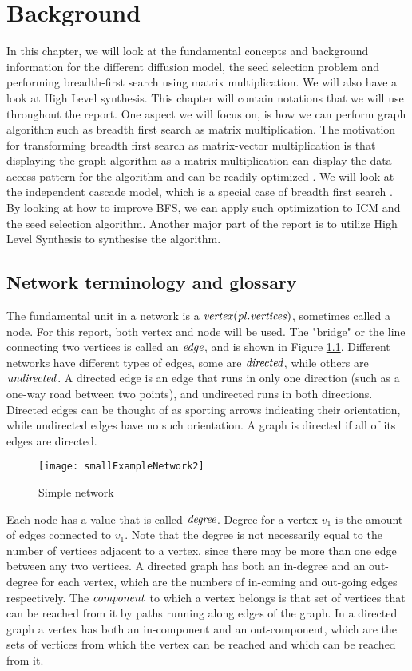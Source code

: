 \chapter{Background} \label{background}

In this chapter, we will look at the fundamental concepts and background information for the different diffusion model, the seed selection problem and performing breadth-first search using matrix multiplication. We will also have a look at High Level synthesis. This chapter will contain notations that we will use throughout the report. One aspect we will focus on, is how we can perform graph algorithm such as breadth first search as matrix multiplication. The motivation for transforming breadth first search as matrix-vector multiplication is that displaying the graph algorithm as a matrix multiplication can display the data access pattern for the algorithm and can be readily optimized  \cite{AlgoToMath}. We will look at the independent cascade model, which is a special case of breadth first search  \cite{HybridBFS2015}. By looking at how to improve BFS, we can apply such optimization to ICM and the seed selection algorithm. Another major part of the report is to utilize High Level Synthesis to synthesise the algorithm. 


\section{Network terminology and glossary}
The fundamental unit in a network is a $\it{{vertex}} (pl. vertices)$, sometimes called a node. For this report, both vertex and node will be used. The "bridge" or the line connecting two vertices is called an $\it{{edge}}$, and is shown in Figure \ref{fig:SimpleGraph}.  Different networks have different types of edges, some are $\it{directed}$, while others are $\it {undirected}$. A directed edge is an edge that runs in only one direction (such as a one-way road between two points), and undirected runs in both directions. Directed edges can be thought of as sporting arrows indicating their orientation, while undirected edges have no such orientation. A graph is directed if all of its edges are directed.

\begin{figure}[!ht]
	\texttt{[image: smallExampleNetwork2]}
	\caption{Simple network} 
	\label{fig:SimpleGraph}
\end{figure}


Each node has a value that is called $\it{{degree}}$. Degree for a vertex $v_1$ is the amount of edges connected to $v_1$. Note that the degree is not necessarily equal to the number of vertices adjacent to a vertex, since there may be more than one edge between any two vertices. A directed graph has both an in-degree and an out-degree for each vertex, which are the numbers of in-coming and out-going edges respectively. The $\it{{component}}$ to which a vertex belongs is that set of vertices that can be reached from it by paths running along edges of the graph. In a directed graph a vertex has both an in-component and an out-component, which are the sets of vertices from which the vertex can be reached and which can be reached from it.

